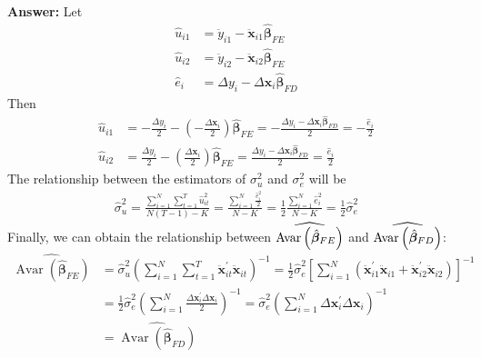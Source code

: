 \begin{enumerate}
\begin{enumerate}
        \textbf{Answer:} Let
        \begin{align*}
            \hat{u}_{i 1}&=\ddot{y}_{i 1}-\ddot{\mathbf{x}}_{i 1} \hat{\boldsymbol{\beta}}_{F E} \\
            \hat{u}_{i 2}&=\ddot{y}_{i 2}-\ddot{\mathbf{x}}_{i 2} \hat{\boldsymbol{\beta}}_{F E} \\
            \hat{e}_i &= \Delta y_{i}-\Delta \mathbf{x}_{i} \hat{\bm{\beta}}_{FD}
        \end{align*}
        Then
        \begin{align*}
            \hat{u}_{i 1} &= -\frac{\Delta y_i}{2} - \left(-\frac{\Delta\mathbf{x}_i}{2}\right)\hat{\bm{\beta}}_{FE} = - \frac{ \Delta y_i - \Delta\mathbf{x}_i \hat{\bm{\beta}}_{FD} }{2} = -\frac{\hat{e}_i}{2} \\
            \hat{u}_{i 2} &= \frac{\Delta y_i}{2} - \left(\frac{\Delta\mathbf{x}_i}{2}\right)\hat{\bm{\beta}}_{FE} = \frac{ \Delta y_i - \Delta\mathbf{x}_i \hat{\bm{\beta}}_{FD} }{2} = \frac{\hat{e}_i}{2}
        \end{align*}
        The relationship between the estimators of $\sigma^2_u$ and $\sigma^2_e$ will be
        \begin{gather*}
            \hat{\sigma}^2_u = \frac{ \displaystyle\sum_{i=1}^N \sum_{t=1}^T \hat{u}_{it}^2 }{ N(T-1) - K } = \frac{ \displaystyle\sum_{i=1}^N \frac{\hat{e}_{i}^2}{2} }{ N - K } = \frac{1}{2} \frac{ \displaystyle\sum_{i=1}^N \hat{e}_{i}^2 }{ N - K } = \frac{1}{2}\hat{\sigma}^2_e
        \end{gather*}
        Finally, we can obtain the relationship between $\displaystyle\widehat{\mathrm{Avar}\left( \hat{\bm{\beta}}_{FE} \right)}$ and $\displaystyle\widehat{\mathrm{Avar}\left( \hat{\bm{\beta}}_{FD} \right)}$:
        \begin{align*}
            \widehat{\operatorname{Avar}\left(\hat{\boldsymbol{\beta}}_{F E}\right)} &= \hat{\sigma}_{u}^{2}\left(\sum_{i=1}^{N} \sum_{t=1}^{T} \ddot{\mathbf{x}}_{i t}^{\prime} \ddot{\mathbf{x}}_{i t}\right)^{-1} = \frac{1}{2}\hat{\sigma}^2_e \left[\sum_{i=1}^{N}\left(\ddot{\mathbf{x}}_{i 1}^{\prime} \ddot{\mathbf{x}}_{i 1}+\ddot{\mathbf{x}}_{i 2}^{\prime} \ddot{\mathbf{x}}_{i 2}\right)\right]^{-1} \\
            &= \frac{1}{2}\hat{\sigma}^2_e \left(\sum_{i=1}^{N} \frac{\Delta \mathbf{x}_{i}^{\prime} \Delta \mathbf{x}_{i}}{2} \right)^{-1} = \hat{\sigma}^2_e \left(\sum_{i=1}^{N} \Delta \mathbf{x}_{i}^{\prime} \Delta \mathbf{x}_{i} \right)^{-1} \\
            &= \widehat{\operatorname{Avar}\left(\hat{\boldsymbol{\beta}}_{F D}\right)}
        \end{align*}
    \end{enumerate}
    

\end{enumerate}

